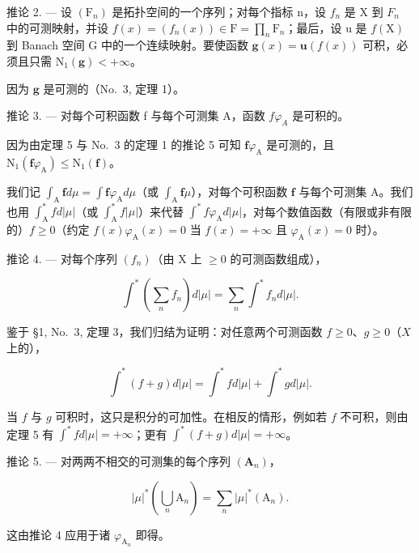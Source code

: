 推论 2. --- 设 \((\mathrm{F}_{n})\) 是拓扑空间的一个序列；对每个指标 n，设 \(f_{n}\) 是 X 到 \(F_{n}\) 中的可测映射，并设 \(f(x) = (f_{n}(x)) \in \mathrm{F} = \prod_{n} \mathrm{F}_{n}\)；最后，设 u 是 \(f(\mathrm{X})\) 到 Banach 空间 G 中的一个连续映射。要使函数 \(\mathbf{g}(x) = \mathbf{u}(f(x))\) 可积，必须且只需 \(\mathrm{N}_{1}(\mathbf{g}) < +\infty\)。

因为 \(\mathbf{g}\) 是可测的（No.~3, 定理 1）。

推论 3. --- 对每个可积函数 f 与每个可测集 A，函数 \(f\varphi_{A}\) 是可积的。

因为由定理 5 与 No.~3 的定理 1 的推论 5 可知 \(\mathbf{f}\varphi_{\mathrm{A}}\) 是可测的，且 \(\mathrm{N}_1(\mathbf{f}\varphi_{\mathrm{A}}) \leqslant \mathrm{N}_1(\mathbf{f})\)。

我们记 \(\int_{\mathrm{A}} \mathbf{f} d\mu = \int \mathbf{f} \varphi_{\mathrm{A}} d\mu\)（或 \(\int_{\mathrm{A}} \mathbf{f} \mu\)），对每个可积函数 \(\mathbf{f}\) 与每个可测集 \(\mathrm{A}\)。我们也用 \(\int_{\mathrm{A}}^{*} f d|\mu|\)（或 \(\int_{\mathrm{A}}^{*} f |\mu|\)）来代替 \(\int^{*} f \varphi_{\mathrm{A}} d|\mu|\)，对每个数值函数（有限或非有限的）\(f \geqslant 0\)（约定 \(f(x) \varphi_{\mathrm{A}}(x) = 0\) 当 \(f(x) = +\infty\) 且 \(\varphi_{\mathrm{A}}(x) = 0\) 时）。

推论 4. --- 对每个序列 \((f_{n})\)（由 X 上 \(\geqslant 0\) 的可测函数组成），

\[
\int^ {*} \left(\sum_ {n} f _ {n}\right) d | \mu | = \sum_ {n} \int^ {*} f _ {n} d | \mu |.\tag{1}
\]

鉴于 §1, No.~3, 定理 3，我们归结为证明：对任意两个可测函数 \(f \geqslant 0\)、\(g \geqslant 0\)（\(X\) 上的），

\[
\int^ {*} (f + g) d | \mu | = \int^ {*} f d | \mu | + \int^ {*} g d | \mu |.\tag{2}
\]

当 \(f\) 与 \(g\) 可积时，这只是积分的可加性。在相反的情形，例如若 \(f\) 不可积，则由定理 5 有 \(\int^{*} f d|\mu| = +\infty\)；更有 \(\int^{*}(f + g) d|\mu| = +\infty\)。

推论 5. --- 对两两不相交的可测集的每个序列 \((\mathbf{A}_{n})\)，

\[
| \mu | ^ {*} \left(\bigcup_ {n} \mathrm{A} _ {n}\right) = \sum_ {n} | \mu | ^ {*} (\mathrm{A} _ {n}).
\]

这由推论 4 应用于诸 \(\varphi_{\mathrm{A}_n}\) 即得。
